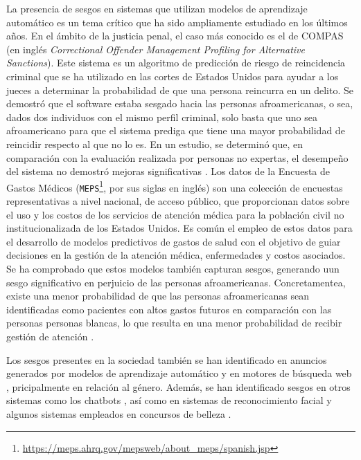     La presencia de sesgos en sistemas que utilizan modelos de aprendizaje autom\'atico es un tema cr\'itico que ha sido
    ampliamente estudiado en los \'ultimos a\~nos. En el \'ambito de la justicia penal, el caso m\'as conocido es el de COMPAS \parencite{propublica}
    (en ingl\'es \textit{Correctional Offender Management Profiling for Alternative Sanctions}). Este sistema es un algoritmo de predicci\'on
    de riesgo de reincidencia criminal que se ha utilizado en las cortes de Estados Unidos para ayudar a los jueces a determinar la 
    probabilidad de que una persona reincurra en un delito. Se demostr\'o que el software estaba sesgado hacia las personas 
    afroamericanas, o sea, dados dos individuos con el mismo perfil criminal, solo basta que uno sea afroamericano para que el
    sistema prediga que tiene una mayor probabilidad de reincidir respecto al que no lo es. En un estudio, se determin\'o que, 
    en comparaci\'on con la evaluaci\'on realizada por personas no expertas, el desempe\~no del sistema no demostr\'o mejoras 
    significativas \parencite{compas2}. 
    Los datos de la Encuesta de Gastos M\'edicos (\texttt{MEPS}\footnote{\url{https://meps.ahrq.gov/mepsweb/about_meps/spanish.jsp}}, 
    por sus siglas en ingl\'es) son una colecci\'on de encuestas representativas a nivel nacional, de acceso p\'ublico, que proporcionan 
    datos sobre el uso y los costos de los servicios de atenci\'on m\'edica para la poblaci\'on civil no institucionalizada de los Estados Unidos. 
    Es com\'un el empleo de estos datos para el desarrollo de modelos predictivos de gastos de salud con el objetivo de guiar decisiones 
    en la gesti\'on de la atenci\'on m\'edica, enfermedades y costos asociados. Se ha comprobado que estos modelos tambi\'en capturan sesgos, 
    generando uun sesgo significativo en perjuicio de las personas afroamericanas. Concretamentea, existe una menor probabilidad de que 
    las personas afroamericanas sean identificadas como pacientes con altos gastos futuros en comparaci\'on con las personas personas blancas, 
    lo que resulta en una menor probabilidad de recibir gesti\'on de atenci\'on \parencite{understanding}.

    Los sesgos presentes en la sociedad tambi\'en se han identificado en anuncios generados por modelos de aprendizaje autom\'atico
    \parencite{sweeney2013discrimination,datta2015automated} y en motores de b\'usqueda web \parencite{unequal_rep}, pricipalmente en relaci\'on al 
    g\'enero. Adem\'as, se han identificado sesgos en otros sistemas como los chatbots \parencite{chatbot_bias}, as\'i como en sistemas de 
    reconocimiento facial \parencite{facial_bias} y algunos sistemas empleados en concursos de belleza \parencite{beauty}.

